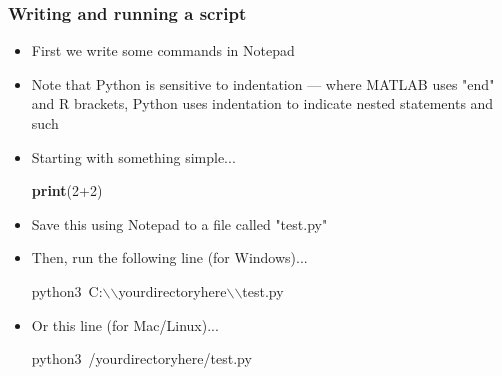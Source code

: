 \documentclass{beamer}\usepackage[]{graphicx}\usepackage[]{color}
\makeatletter
\newcommand{\hlnum}[1]{\textcolor[rgb]{0.686,0.059,0.569}{#1}}%
\newcommand{\hlcom}[1]{\textcolor[rgb]{0.678,0.584,0.686}{\textit{#1}}}%
\newcommand{\hlopt}[1]{\textcolor[rgb]{0,0,0}{#1}}%
\newcommand{\hlstd}[1]{\textcolor[rgb]{0.345,0.345,0.345}{#1}}%
\newcommand{\hlkwa}[1]{\textcolor[rgb]{0.161,0.373,0.58}{\textbf{#1}}}%
\newcommand{\hlkwb}[1]{\textcolor[rgb]{0.69,0.353,0.396}{#1}}%
\newenvironment{kframe}{%
 \def\at@end@of@kframe{}%
 \ifinner\ifhmode%
  \def\at@end@of@kframe{\end{minipage}}%
  \begin{minipage}{\columnwidth}%
 \fi\fi%
 \def\FrameCommand##1{\hskip\@totalleftmargin \hskip-\fboxsep
 \colorbox{shadecolor}{##1}\hskip-\fboxsep
     \hskip-\linewidth \hskip-\@totalleftmargin \hskip\columnwidth}%
 \MakeFramed {\advance\hsize-\width
   \@totalleftmargin\z@ \linewidth\hsize
   \@setminipage}}%
 {\par\unskip\endMakeFramed%
 \at@end@of@kframe}
\newenvironment{knitrout}{}{} %
\let\hlesc\hlstd \let\hlpps\hlstd \let\hllin\hlstd \let\hlslc\hlcom \let\hlppc\hlcom
\makeatother
\begin{document}
\begin{frame}[fragile]
\frametitle{Writing and running a script}
\begin{itemize}
	\item First we write some commands in Notepad 

	\item Note that Python is sensitive to indentation --- where MATLAB uses "end" and R brackets, Python uses indentation to indicate nested statements and such

	\item Starting with something simple...

\begin{knitrout}
\color{fgcolor}\begin{kframe}
\noindent
\ttfamily
\hlstd{}\hlkwa{print}\hlstd{}\hlopt{(}\hlstd{}\hlnum{2}\hlstd{}\hlopt{+}\hlstd{}\hlnum{2}\hlstd{}\hlopt{)}\hlstd{}\hspace*{\fill}
\mbox{}
\normalfont
\end{kframe}
\end{knitrout}

	\item Save this using Notepad to a file called "test.py"

	\item Then, run the following line (for Windows)...

\begin{knitrout}
\color{fgcolor}\begin{kframe}
\noindent
\ttfamily
\hlstd{python3\ C}\hlopt{:}\hlstd{}\hlesc{$\backslash$$\backslash$}\hlstd{your\textunderscore directory\textunderscore here}\hlesc{$\backslash$$\backslash$}\hlstd{}\hlkwb{test}\hlstd{.py}\hspace*{\fill}
\mbox{}
\normalfont
\end{kframe}
\end{knitrout}

	\item Or this line (for Mac/Linux)...

\begin{knitrout}
\color{fgcolor}\begin{kframe}
\noindent
\ttfamily
\hlstd{python3\ }\hlopt{/}\hlstd{your\textunderscore directory\textunderscore here}\hlopt{/}\hlstd{}\hlkwb{test}\hlstd{.py}\hspace*{\fill}
\mbox{}
\normalfont
\end{kframe}
\end{knitrout}

\end{itemize}
\end{frame}
\end{document}
